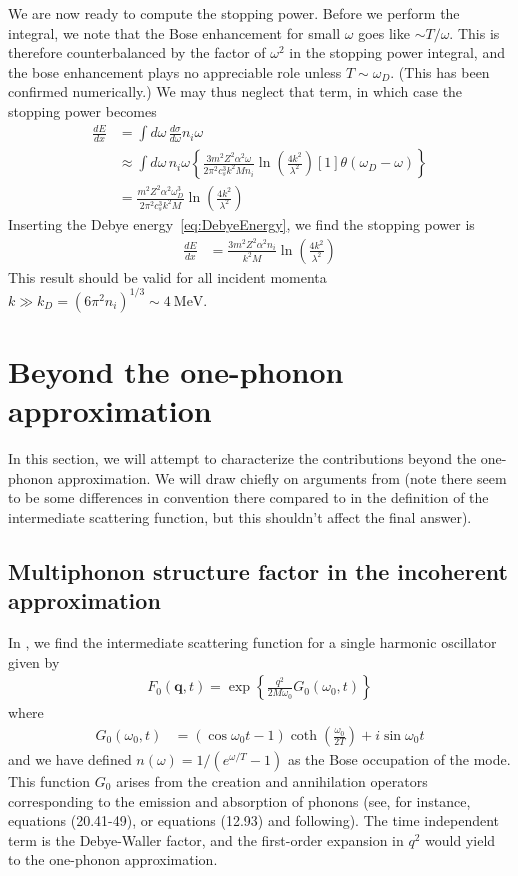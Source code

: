 \documentclass{article}
\newcommand{\MeV}{\text{MeV}}
\begin{document}
We are now ready to compute the stopping power. Before we perform the integral, we note that the Bose enhancement for small $\omega$ goes like $ \sim T / \omega$. This is therefore counterbalanced by the factor of $\omega^2$ in the stopping power integral, and the bose enhancement plays no appreciable role unless $T \sim \omega_D$. (This has been confirmed numerically.) We may thus neglect that term, in which case the stopping power becomes
\begin{align}
\frac{dE}{d x} &= \int d \omega \,\frac{d \sigma}{d \omega} n_i \omega \\
  &\approx \int d \omega \,n_i \omega \left\{ \frac{3 m^2 Z^2 \alpha^2 \omega}{2\pi^2 c_s^3 k^2 M n_i} \ln \left( \frac{4 k^2}{\lambda^2} \right) \left[ 1 \right] \theta(\omega_D - \omega) \right\} \\
   &= \frac{m^2 Z^2 \alpha^2 \omega_D^3}{2 \pi^2 c_s^3 k^2 M} \ln\left( \frac{4 k^2}{\lambda^2} \right)
\end{align}
Inserting the Debye energy~\eqref{eq:DebyeEnergy}, we find the stopping power is
\begin{align}
\frac{d E}{d x} &= \frac{3 m^2 Z^2 \alpha^2 n_i}{k^2 M} \ln\left( \frac{4 k^2}{\lambda^2} \right)
\end{align}
This result should be valid for all incident momenta $k\gg k_D = (6 \pi^2 n_i)^{1/3} \sim 4~\MeV$.

\section{Beyond the one-phonon approximation}

In this section, we will attempt to characterize the contributions beyond the one-phonon approximation. We will draw chiefly on arguments from \cite{impulse} (note there seem to be some differences in convention there compared to \cite{quantum} in the definition of the intermediate scattering function, but this shouldn't affect the final answer).

\subsection{Multiphonon structure factor in the incoherent approximation}

In \cite{impulse}, we find the intermediate scattering function for a single harmonic oscillator given by
\begin{align}
F_0(\textbf{q}, t) = \exp\left\{ \frac{q^2}{2 M \omega_0} G_0(\omega_0, t) \right\}
\end{align}
where
\begin{align}
G_0(\omega_0, t) &= (\cos\omega_0 t - 1) \coth\left( \frac{\omega_0}{2 T} \right) + i \sin\omega_0 t
\end{align}
and we have defined $n(\omega) = 1 / (e^{\omega/T} - 1)$ as the Bose occupation of the mode. This function $G_0$ arises from the creation and annihilation operators corresponding to the emission and absorption of phonons (see, for instance, \cite{quantum} equations (20.41-49), or \cite{interactions} equations (12.93) and following). The time independent term is the Debye-Waller factor, and the first-order expansion in $q^2$ would yield to the one-phonon approximation.
\end{document}
